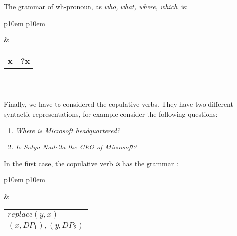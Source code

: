 The grammar of wh-pronoun, as \textit{who, what, where, which}, is:
\medskip
\begin{center}
\begin{tabular}{ p{10em} p{10em} }
	\label{tbl:grammar.who}
	
	\begin{center}
		\begin{tikzpicture}
		\Tree [.DP  [.PRN who ] ]
		\end{tikzpicture}
	\end{center}
		
	&

	\begin{center}
		\begin{tabular}{|c|l|}
			\hline
			x & ?x\\ 
			\hline
			\multicolumn{2}{|l|}{
				\mbox{}
			} \\
			\hline
			\multicolumn{2}{|l|}{
				\mbox{}
			} \\
			\hline
		\end{tabular}
	\end{center}	
	\\
\end{tabular}
\end{center}
\medskip

Finally, we have to considered the copulative verbs. They have two different syntactic representations, for example consider the following questions:
\begin{enumerate}
\item \textit{Where is Microsoft headquartered?}
\item \textit{Is Satya Nadella the CEO of Microsoft?}
\end{enumerate}
In the first case, the copulative verb \textit{is} has the grammar :
\medskip
\begin{center}
\begin{tabular}{ p{10em} p{10em} }
	\label{tbl:grammar.is}
	
	\begin{center}
		\begin{tikzpicture}
		\Tree [.S [.DP$_1\downarrow$ ] [.VP [.V is ] DP$_2\downarrow$ ] ]	
		\end{tikzpicture}
	\end{center}
	
	&

	\begin{center}
		\begin{tabular}{|c|l|}
			\hline
			\mbox{} & \mbox{}\\
			\hline
			\multicolumn{2}{|l|}{
				$replace(y,x)$
			} \\
			\hline
			\multicolumn{2}{|l|}{
				$(x,DP_{1}),(y,DP_{2})$
			} \\
			\hline
		\end{tabular}
	\end{center}	
	\\
\end{tabular}
\end{center}
\medskip

